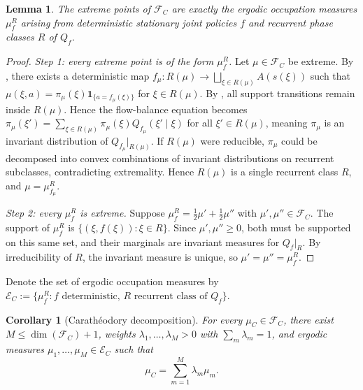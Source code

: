 \documentclass[12pt,a4paper]{article}
\newtheorem{lemma}[theorem]{Lemma}
\newtheorem{corollary}[theorem]{Corollary}
\theoremstyle{definition}
\begin{document}
\begin{lemma}\label{lem:extreme-iff-ergodic}
The extreme points of $\mathcal{F}_C$ are exactly the ergodic occupation measures $\mu_f^R$ arising from deterministic stationary joint policies $f$ and recurrent phase classes $R$ of $Q_f$.
\end{lemma}

\begin{proof}
\emph{Step 1: every extreme point is of the form $\mu_f^R$.}
Let $\mu \in \mathcal{F}_C$ be extreme. By , there exists a deterministic map $f_\mu \colon R(\mu) \to \bigsqcup_{\xi \in R(\mu)} A(s(\xi))$ such that $\mu(\xi, a) = \pi_\mu(\xi) \mathbf{1}_{\{a = f_\mu(\xi)\}}$ for $\xi \in R(\mu)$. By , all support transitions remain inside $R(\mu)$. Hence the flow-balance equation becomes $\pi_\mu(\xi') = \sum_{\xi \in R(\mu)} \pi_\mu(\xi) Q_{f_\mu}(\xi' \mid \xi)$ for all $\xi' \in R(\mu)$, meaning $\pi_\mu$ is an invariant distribution of $Q_{f_\mu}|_{R(\mu)}$. If $R(\mu)$ were reducible, $\pi_\mu$ could be decomposed into convex combinations of invariant distributions on recurrent subclasses, contradicting extremality. Hence $R(\mu)$ is a single recurrent class $R$, and $\mu = \mu_{f_\mu}^R$.

\smallskip

\emph{Step 2: every $\mu_f^R$ is extreme.}
Suppose $\mu_f^R = \tfrac{1}{2}\mu' + \tfrac{1}{2}\mu''$ with $\mu', \mu'' \in \mathcal{F}_C$. The support of $\mu_f^R$ is $\{(\xi, f(\xi)) : \xi \in R\}$. Since $\mu', \mu'' \geq 0$, both must be supported on this same set, and their marginals are invariant measures for $Q_f|_R$. By irreducibility of $R$, the invariant measure is unique, so $\mu' = \mu'' = \mu_f^R$.
\end{proof}

Denote the set of ergodic occupation measures by $\mathcal{E}_C := \{\mu_f^R : f \text{ deterministic, } R \text{ recurrent class of } Q_f\}$.

\begin{corollary}[Carath\'eodory decomposition]\label{cor:convhull}
For every $\mu_C \in \mathcal{F}_C$, there exist $M \leq \dim(\mathcal{F}_C) + 1$, weights $\lambda_1, \ldots, \lambda_M > 0$ with $\sum_m \lambda_m = 1$, and ergodic measures $\mu_1, \ldots, \mu_M \in \mathcal{E}_C$ such that
\begin{equation}\label{eq:caratheodory}
\mu_C = \sum_{m=1}^M \lambda_m \mu_m.
\end{equation}
\end{corollary}
\end{document}
